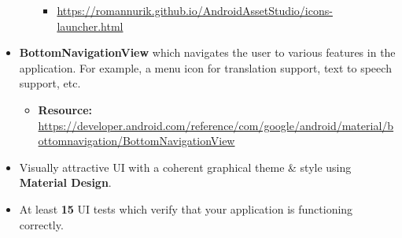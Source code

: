 \documentclass{article}
\begin{document}
\begin{itemize}
\begin{itemize}
\begin{itemize}
			            \item \footnotesize\href{https://romannurik.github.io/AndroidAssetStudio/icons-launcher.html}{https://romannurik.github.io/AndroidAssetStudio/icons-launcher.html}
		            \end{itemize}
	      \end{itemize}
	\item \textbf{BottomNavigationView} which navigates the user to various features in the application. For example, a menu icon for translation support, text to speech support, etc.
	      \begin{itemize}
		      \item \textbf{Resource:} \footnotesize\href{https://developer.android.com/reference/com/google/android/material/bottomnavigation/BottomNavigationView}{https://developer.android.com/reference/com/google/android/material/bottomnavigation/BottomNavigationView}
	      \end{itemize}
	\item Visually attractive UI with a coherent graphical theme \& style using \textbf{Material Design}.
	\item At least \textbf{15} UI tests which verify that your application is functioning correctly.
\end{itemize}
\end{document}

